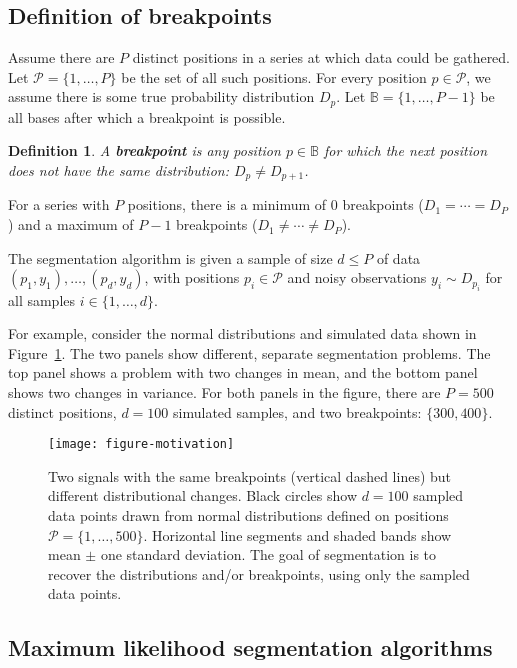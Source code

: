 \documentclass{jsfds} %
\newtheorem{definition}{Definition}
\begin{document}
\subsection{Definition of breakpoints}

Assume there are $P$ distinct positions in a series at
which data could be gathered. Let $\mathcal P= \{1,\dots,P\}$ be the
set of all such positions. For every position $p\in\mathcal P$, we
assume there is some true probability distribution $D_p$. Let $\mathbb
B=\{1,\dots,P-1\}$ be all bases after which a breakpoint is possible.

\begin{definition}
  A \textbf{breakpoint} is any position $p\in\mathbb B$ for which the
  next position does not have the same distribution: $D_p \neq
  D_{p+1}$. 
\end{definition}

For a series with $P$ positions, there is a minimum of 0 breakpoints
($D_1=\cdots=D_P$) and a maximum of $P-1$ breakpoints ($D_1 \neq
\cdots \neq D_P$).

The segmentation algorithm is given a sample of size $d \leq P$ of
data $(p_1, y_1), \dots, (p_d, y_d)$, with positions $p_i\in\mathcal
P$ and noisy observations $y_i\sim D_{p_i}$ for all samples $i\in\{1,
\dots, d\}$.

\newpage

For example, consider the normal distributions and simulated data
shown in Figure~\ref{fig:motivation}. The two panels show different,
separate segmentation problems. The top panel shows a problem with two
changes in mean, and the bottom panel shows two changes in
variance. For both panels in the figure, there are $P=500$ distinct
positions, $d=100$ simulated samples, and two breakpoints:
$\{300, 400\}$.

\begin{figure}[h!]
  \centering
  \texttt{[image: figure-motivation]}
  \vskip -0.5cm
  \caption{Two signals with the same breakpoints (vertical dashed
    lines) but different distributional changes. Black circles show
    $d=100$ sampled data points drawn from normal distributions
    defined on positions $\mathcal P=\{1, \dots, 500\}$. Horizontal line
    segments and shaded bands show mean $\pm$ one standard
    deviation. The goal of segmentation is to recover the
    distributions and/or breakpoints, using only the sampled data
    points.}
  \label{fig:motivation}
\end{figure}

\subsection{Maximum likelihood segmentation algorithms}
\label{sec:max-lik}
\end{document}

